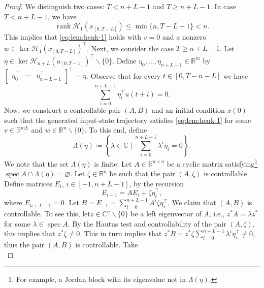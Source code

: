 \documentclass[10pt,a4paper]{amsart}
\DeclareMathOperator{\rank}{rank}
\DeclareMathOperator{\spec}{spec}
\newcommand{\set}[2]{\left\{#1 \mid #2\right\}}
\begin{document}
\begin{proof}
We distinguish two cases: $T<n+L-1$ and \mbox{$T\geq n+L-1$}. In case $T<n+L-1$, we have
\begin{equation}
\rank\mathcal{H}_1(x_{[0,T-L]})\leq \min\{n,T-L+1\}<n.
\end{equation}
This implies that \eqref{eq:lem:henk-1} holds with $v=0$ and a nonzero \mbox{$w\in\ker\mathcal{H}_1(x_{[0,T-L]})^\top$}. Next, we consider the case \mbox{$T\geq n+L-1$}. Let $\eta\in\ker \mathcal{H}_{n+L}(u_{[0,T-1]})^\top\backslash\{0\}$.
Define $\eta_0,\ldots,\eta_{n+L-1}\in\mathbb{R}^m$ by $\begin{bmatrix}
\eta_0^\top & \cdots & \eta_{n+L-1}^\top
\end{bmatrix}^\top=\eta$. Observe that for every $t\in[0,T-n-L]$ we have
\begin{equation}
\label{eq:ker2}
\sum_{i=0}^{n+L-1}\eta_i^\top u(t+i)=0.
\end{equation}
Now, we construct a controllable pair $(A,B)$ and an initial condition $x(0)$ such that the generated input-state trajectory satisfies \eqref{eq:lem:henk-1} for some $v\in\mathbb{R}^{mL}$ and $w\in\mathbb{R}^n\backslash\{0\}$. To this end, define
\begin{equation}
\label{eq:Lambda}
\Lambda(\eta)\coloneqq\set{\lambda\in\mathbb{C}}{\textstyle\sum_{i=0}^{n+L-1}\lambda^i \eta_i=0}.
\end{equation}
We note that the set $\Lambda(\eta)$ is finite. Let $A\in\mathbb{R}^{n\times n}$ be a cyclic matrix satisfying\footnote{For example, a Jordan block with its eigenvalue not in $\Lambda(\eta)$.} $\spec A\cap\Lambda(\eta)=\varnothing$. Let $\zeta\in\mathbb{R}^n$ be such that the pair $(A,\zeta)$ is controllable. Define matrices $E_i$, \mbox{$i\in[-1,n+L-1]$}, by the recursion
\begin{equation}
\label{eq:Ei_recursive}
E_{i-1}=AE_{i}+\zeta\eta_i^\top,
\end{equation}
where $E_{n+L-1}=0$. Let $B=E_{-1}=\sum_{i=0}^{n+L-1}A^i\zeta\eta_i^\top$. We claim that $(A,B)$ is controllable. To see this, let\linebreak $z\in\mathbb{C}^n\backslash \{0\}$ be a left eigenvector of $A$, i.e., $z^*A=\lambda z^*$ for some $\lambda\in\spec A$. By the Hautus test and controllability of the pair $(A,\zeta)$, this implies that $z^*\zeta\neq 0$. This in turn implies that $z^* B=z^* \zeta\sum_{i=0}^{n+L-1} \lambda^i \eta_i^\top\neq 0$, thus the pair $(A,B)$ is controllable. Take
\begin{equation}
\label{eq:x(0)}

\end{equation}
\end{proof}
\end{document}
